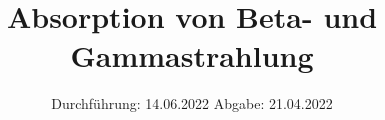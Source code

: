 

\subject{VERSUCH NUMMER 704}
\title{Absorption von Beta- und Gammastrahlung}
\date{%
  Durchführung: 14.06.2022
  \hspace{3em}
  Abgabe: 21.04.2022
}



\maketitle
\thispagestyle{empty}
\tableofcontents
\newpage






\printbibliography{}


